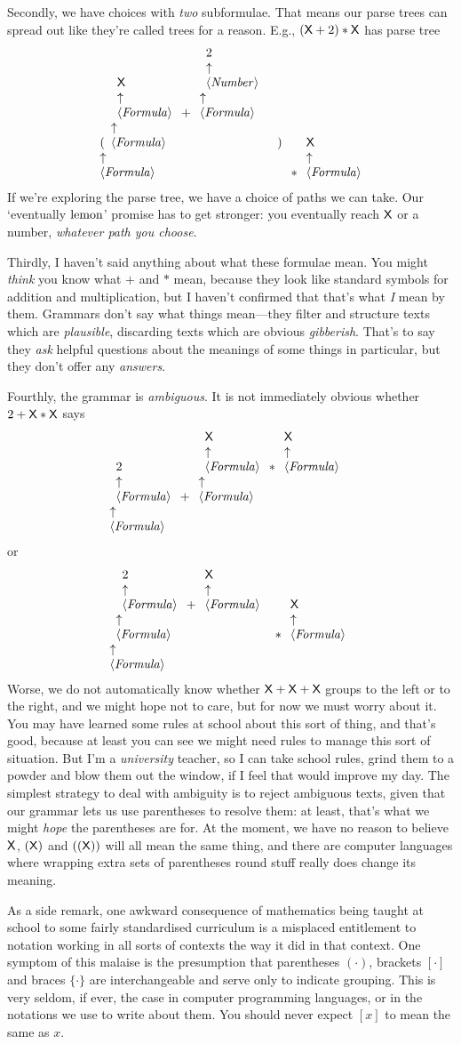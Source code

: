 \documentclass{book}
\begin{document}
Secondly, we have choices with \emph{two} subformulae. That means our parse trees can spread out like they're called trees for a reason. E.g., $(\X + 2)*\X$ has parse tree
\[
\nta{Formula}{(\nta{Formula}{\nta{Formula}{\X} + \nta{Formula}{\nta{Number}{2}}})}
*
\nta{Formula}{\X}
\]
If we're exploring the parse tree, we have a choice of paths we can take. Our `eventually $\lemon$' promise has to get stronger: you eventually reach $\X$ or a number, \emph{whatever path you choose}.

Thirdly, I haven't said anything about what these formulae mean. You might \emph{think} you know what $+$ and $*$ mean, because they look like standard symbols for addition and multiplication, but I haven't confirmed that that's what \emph{I} mean by them. Grammars don't say what things mean---they filter and structure texts which are \emph{plausible}, discarding texts which are obvious \emph{gibberish}. That's to say they \emph{ask} helpful questions about the meanings of some things in particular, but they don't offer any \emph{answers}.

Fourthly, the grammar is \emph{ambiguous}. It is not immediately obvious whether $2+\X*\X$ says
\[
\nta{Formula}{\nta{Formula}{2}+\nta{Formula}{\nta{Formula}{\X}*\nta{Formula}{\X}}}
\]
or
\[
\nta{Formula}{\nta{Formula}{\nta{Formula}{2}+\nta{Formula}{\X}}*\nta{Formula}{\X}}
\]
Worse, we do not automatically know whether $\X+\X+\X$ groups to the left or to the right, and we might hope not to care, but for now we must worry about it. You may have learned some rules at school about this sort of thing, and that's good, because at least you can see we might need rules to manage this sort of situation. But I'm a \emph{university} teacher, so I can take school rules, grind them to a powder and blow them out the window, if I feel that would improve my day.
The simplest strategy to deal with ambiguity is to reject ambiguous texts, given that our grammar lets us use parentheses to resolve them: at least, that's what we might \emph{hope} the parentheses are for. At the moment, we have no reason to believe $\X$, $(\X)$ and $((\X))$ will all mean the same thing, and there are computer languages where wrapping extra sets of parentheses round stuff really does change its meaning.

As a side remark, one awkward consequence of mathematics being taught at school to some fairly standardised curriculum is a misplaced entitlement to notation working in all sorts of contexts the way it did in that context. One symptom of this malaise is the presumption that parentheses $(\cdot)$, brackets $[\cdot]$ and braces $\{\cdot\}$ are interchangeable and serve only to indicate grouping. This is very seldom, if ever, the case in computer programming languages, or in the notations we use to write about them. You should never expect $[x]$ to mean the same as $x$.
\end{document}

